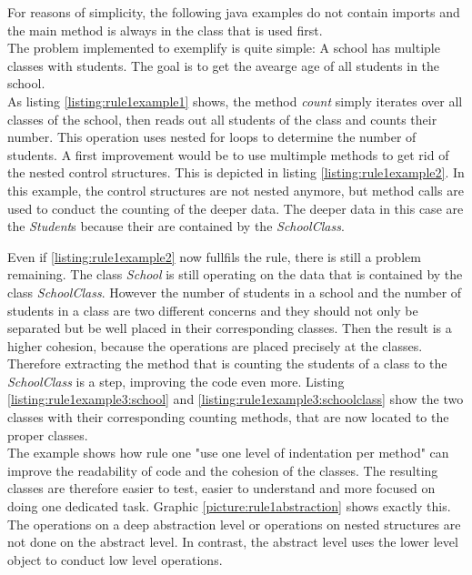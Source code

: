 For reasons of simplicity, the following java examples do not contain imports and the main method is always in the class that is used first. 
\\
The problem implemented to exemplify is quite simple: A school has multiple classes with students. The goal is to get the avearge age of all students in the school. 
\\

As listing \ref{listing:rule1example1} shows, the method \textit{count} simply iterates over all classes of the school, then reads out all students of the class and counts their number. This operation uses nested for loops to determine the number of students. A first improvement would be to use multimple methods to get rid of the nested control structures. This is depicted in listing \ref{listing:rule1example2}. In this example, the control structures are not nested anymore, but method calls are used to conduct the counting of the deeper data. The deeper data in this case are the \textit{Student}s because their are contained by the \textit{SchoolClass}. 

Even if \ref{listing:rule1example2} now fullfils the rule, there is still a problem remaining. The class \textit{School} is still operating on the data that is contained by the class \textit{SchoolClass}. However the number of students in a school and the number of students in a class are two different concerns and they should not only be separated but be well placed in their corresponding classes. Then the result is a higher cohesion, because the operations are placed precisely at the classes. Therefore extracting the method that is counting the students of a class to the \textit{SchoolClass} is a step, improving the code even more. Listing \ref{listing:rule1example3:school} and \ref{listing:rule1example3:schoolclass} show the two classes with their corresponding counting methods, that are now located to the proper classes. 
\\

The example shows how rule one "use one level of indentation per method" can improve the readability of code and the cohesion of the classes. The resulting classes are therefore easier to test, easier to understand and more focused on doing one dedicated task. Graphic \ref{picture:rule1abstraction} shows exactly this. The operations on a deep abstraction level or operations on nested structures are not done on the abstract level. In contrast, the abstract level uses the lower level object to conduct low level operations. 

